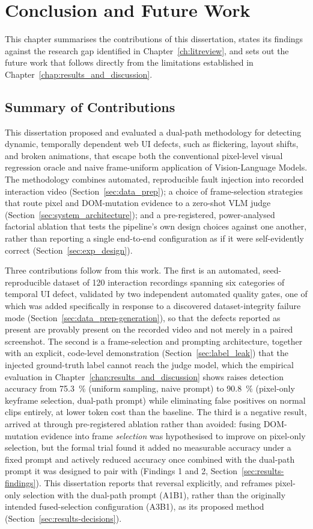 \chapter{Conclusion and Future Work}
\label{chap:conclusion}
This chapter summarises the contributions of this dissertation, states its findings against the research gap identified in Chapter~\ref{ch:litreview}, and sets out the future work that follows directly from the limitations established in Chapter~\ref{chap:results_and_discussion}.

\section{Summary of Contributions}
This dissertation proposed and evaluated a dual-path methodology for detecting dynamic, temporally dependent web UI defects, such as flickering, layout shifts, and broken animations, that escape both the conventional pixel-level visual regression oracle and naive frame-uniform application of Vision-Language Models. The methodology combines automated, reproducible fault injection into recorded interaction video (Section~\ref{sec:data_prep}); a choice of frame-selection strategies that route pixel and DOM-mutation evidence to a zero-shot VLM judge (Section~\ref{sec:system_architecture}); and a pre-registered, power-analysed factorial ablation that tests the pipeline's own design choices against one another, rather than reporting a single end-to-end configuration as if it were self-evidently correct (Section~\ref{sec:exp_design}).

Three contributions follow from this work. The first is an automated, seed-reproducible dataset of 120 interaction recordings spanning six categories of temporal UI defect, validated by two independent automated quality gates, one of which was added specifically in response to a discovered dataset-integrity failure mode (Section~\ref{sec:data_prep-generation}), so that the defects reported as present are provably present on the recorded video and not merely in a paired screenshot. The second is a frame-selection and prompting architecture, together with an explicit, code-level demonstration (Section~\ref{sec:label_leak}) that the injected ground-truth label cannot reach the judge model, which the empirical evaluation in Chapter~\ref{chap:results_and_discussion} shows raises detection accuracy from \SI{75.3}{\percent} (uniform sampling, naive prompt) to \SI{90.8}{\percent} (pixel-only keyframe selection, dual-path prompt) while eliminating false positives on normal clips entirely, at lower token cost than the baseline. The third is a negative result, arrived at through pre-registered ablation rather than avoided: fusing DOM-mutation evidence into frame \emph{selection} was hypothesised to improve on pixel-only selection, but the formal trial found it added no measurable accuracy under a fixed prompt and actively reduced accuracy once combined with the dual-path prompt it was designed to pair with (Findings 1 and 2, Section~\ref{sec:results-findings}). This dissertation reports that reversal explicitly, and reframes pixel-only selection with the dual-path prompt (A1B1), rather than the originally intended fused-selection configuration (A3B1), as its proposed method (Section~\ref{sec:results-decisions}).

